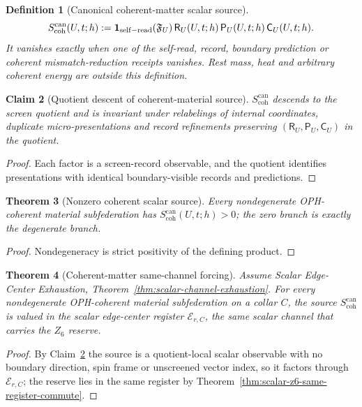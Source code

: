 \documentclass[11pt]{article}
\newtheorem{theorem}{Theorem}[section]
\newtheorem{definition}[theorem]{Definition}
\newtheorem{claim}[theorem]{Claim}
\theoremstyle{remark}
\theoremstyle{plain}
\begin{document}
\begin{definition}[Canonical coherent-matter scalar source]
\label{def:canonical-coherent-matter-scalar-source}
\[
S_{\mathrm{coh}}^{\mathrm{can}}(U,t;h):=\mathbf 1_{\rm self-read}(\mathfrak F_U)\,
\mathsf R_U(U,t;h)\,\mathsf P_U(U,t;h)\,\mathsf C_U(U,t;h).
\]
It vanishes
exactly when one of the self-read, record, boundary prediction or coherent
mismatch-reduction receipts vanishes. Rest mass, heat and arbitrary coherent
energy are outside this definition.
\end{definition}

\begin{claim}[Quotient descent of coherent-material source]
\label{lem:coherent-material-source-quotient-descent}
\(S_{\mathrm{coh}}^{\mathrm{can}}\) descends to the screen quotient and is
invariant under relabelings of internal coordinates, duplicate
micro-presentations and record refinements preserving
\((\mathsf R_U,\mathsf P_U,\mathsf C_U)\) in the quotient.
\end{claim}

\begin{proof}
Each factor is a screen-record observable, and the quotient identifies
presentations with identical boundary-visible records and predictions.
\end{proof}

\begin{theorem}[Nonzero coherent scalar source]
\label{thm:nonzero-coherent-scalar-source}
Every nondegenerate OPH-coherent material subfederation has
\(S_{\mathrm{coh}}^{\mathrm{can}}(U,t;h)>0\); the zero branch is exactly the
degenerate branch.
\end{theorem}

\begin{proof}
Nondegeneracy is strict positivity of the defining product.
\end{proof}

\begin{theorem}[Coherent-matter same-channel forcing]
\label{thm:coherent-matter-same-channel-forcing}
Assume Scalar Edge-Center Exhaustion,
Theorem~\ref{thm:scalar-channel-exhaustion}. For every nondegenerate
OPH-coherent material subfederation on a collar \(C\), the source
\(S_{\mathrm{coh}}^{\mathrm{can}}\) is valued in the scalar edge-center
register \(\mathcal E_{r,C}\), the same scalar channel that carries the
\(Z_6\) reserve.
\end{theorem}

\begin{proof}
By Claim~\ref{lem:coherent-material-source-quotient-descent} the source is a
quotient-local scalar observable with no boundary direction, spin frame or
unscreened vector index, so it factors through \(\mathcal E_{r,C}\); the
reserve lies in the same register by
Theorem~\ref{thm:scalar-z6-same-register-commute}.
\end{proof}
\end{document}
